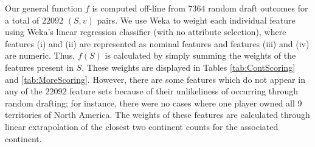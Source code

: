 \documentclass[letterpaper]{article}
\numberwithin{equation}{section}
\numberwithin{theorem}{section}
\numberwithin{lemma}{section}
\numberwithin{df}{section}
\begin{document}
Our general function $f$ is computed off-line from $7364$ random draft outcomes for a total of $22092$ $(S,v)$ pairs.  We use Weka \cite{Weka} to weight each individual feature using Weka's linear regression classifier (with no attribute selection), where features (i) and (ii) are represented as nominal features and features (iii) and (iv) are  numeric.  Thus, $f(S)$ is calculated by simply summing the weights of the features present in $S$.  These weights are displayed in Tables \ref{tab:ContScoring} and \ref{tab:MoreScoring}.  However, there are some features which do not appear in any of the $22092$ feature sets because of their unlikeliness of occurring through random drafting; for instance, there were no cases where one player owned all 9 territories of North America.  The weights of these features are calculated through linear extrapolation of the closest two continent counts for the associated continent.    %
\end{document}
